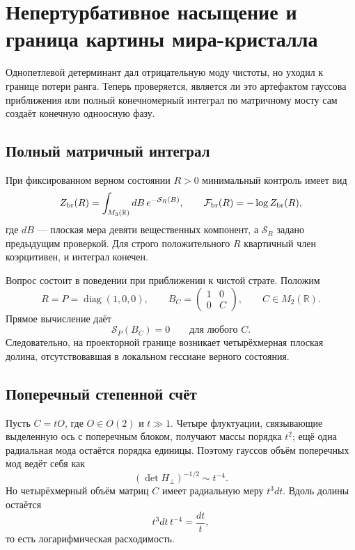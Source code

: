 \chapter{Непертурбативное насыщение и граница картины мира-кристалла}

Однопетлевой детерминант дал отрицательную моду чистоты, но уходил к
границе потери ранга. Теперь проверяется, является ли это артефактом
гауссова приближения или полный конечномерный интеграл по матричному мосту
сам создаёт конечную одноосную фазу.

\section{Полный матричный интеграл}

При фиксированном верном состоянии $R>0$ минимальный контроль имеет вид
\begin{equation}
 Z_{\rm br}(R)
 =\int_{M_3(\mathbb R)}dB\,
  e^{-\mathcal S_R(B)},
 \qquad
 \mathcal F_{\rm br}(R)=-\log Z_{\rm br}(R),
 \label{eq:v6-full-bridge-matrix-integral}
\end{equation}
где $dB$ --- плоская мера девяти вещественных компонент, а
$\mathcal S_R$ задано предыдущим проверкой. Для строго положительного $R$
квартичный член коэрцитивен, и интеграл конечен.

Вопрос состоит в поведении при приближении к чистой страте. Положим
\begin{equation}
 R=P=\operatorname{diag}(1,0,0),
 \qquad
 B_C=\begin{pmatrix}1&0\\0&C\end{pmatrix},
 \qquad C\in M_2(\mathbb R).
 \label{eq:v6-rank-one-flat-valley}
\end{equation}
Прямое вычисление даёт
\begin{equation}
 \mathcal S_P(B_C)=0
 \qquad\text{для любого }C.
 \label{eq:v6-flat-crystal-valley}
\end{equation}
Следовательно, на проекторной границе возникает четырёхмерная плоская
долина, отсутствовавшая в локальном гессиане верного состояния.

\section{Поперечный степенной счёт}

Пусть $C=tO$, где $O\in O(2)$ и $t\gg1$. Четыре флуктуации, связывающие
выделенную ось с поперечным блоком, получают массы порядка $t^2$; ещё одна
радиальная мода остаётся порядка единицы. Поэтому гауссов объём поперечных
мод ведёт себя как
\begin{equation}
 (\det H_\perp)^{-1/2}\sim t^{-4}.
\end{equation}
Но четырёхмерный объём матриц $C$ имеет радиальную меру $t^3dt$. Вдоль
долины остаётся
\begin{equation}
 t^3dt\,t^{-4}=\frac{dt}{t},
\end{equation}
то есть логарифмическая расходимость.

